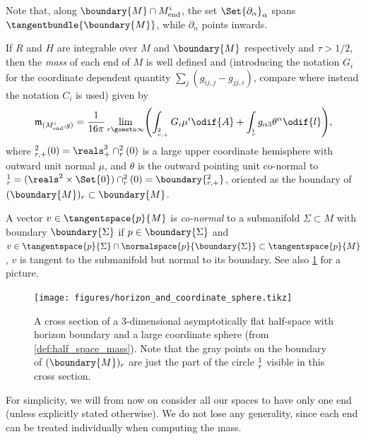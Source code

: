 \documentclass[titlepage,numbers=noenddot,oneside,%
cleardoublepage=empty,paper=a4,fontsize=11pt,%
english,%
]{scrartcl}
\let\sphere\relax
\newcommand{\sphere}{\mathbb{S}}
\newcommand{\Mend}{M_{\mathrm{end}}} %
\newcommand{\mass}[2]{\mathfrak{m}_{(#1,#2)}} %
\begin{document}
Note that, along \( \boundary{M}\cap \Mend^i \), the set \( \Set{\partial_\alpha}_\alpha \) spans \( \tangentbundle{\boundary{M}} \), while \( \partial_n \) points inwards.
\begin{definition}\label{def:half_space_mass}
    If \( R \) and \( H \) are integrable over \( M \) and \( \boundary{M} \) respectively and \( \tau>1/2 \), then the \emph{mass} of each end of \( M \) is well defined and (introducing the notation \( G_i \) for the coordinate dependent quantity \( \sum_j (g_{ij,j}-g_{jj,i}) \), compare \cite[Definition 1.1]{almarazPositiveMassTheorem2016} where instead the notation \( C_i \) is used) given by
    \begin{equation*}
        \mass{M_{\mathrm{end}}^i}{g}=\frac{1}{16\pi}\lim_{r \goesto \infty}\Biggl(\int_{\sphere_{r,+}^{2}}G_i\mu^i\odif{A}+\int_{\sphere_r^{1}}g_{\alpha 3}\theta^\alpha\odif{l}\Biggr),
    \end{equation*}
    where \( \sphere_{r,+}^{2}(0)=\reals^3_+\cap \sphere_r^2(0) \) is a large upper coordinate hemisphere with outward unit normal \( \mu \), and \( \theta \) is the outward pointing unit co-normal to \( \sphere_{r}^1=(\reals^2\times \Set{0})\cap \sphere_r^2(0)=\boundary{\sphere_{r,+}^2} \), oriented as the boundary of \( (\boundary{M})_r\subset \boundary{M} \).
\end{definition}
\begin{remark}\label{def:co-normal_vector}
    A vector \( v\in \tangentspace{p}{M} \) is \emph{co-normal} to a submanifold \( \Sigma\subset M \) with boundary \( \boundary{\Sigma} \) if \( p\in \boundary{\Sigma} \) and \( v\in \tangentspace{p}{\Sigma}\cap \normalspace{p}{\boundary{\Sigma}}\subset \tangentspace{p}{M} \), \ie \( v \) is tangent to the submanifold but normal to its boundary. See also \cref{fig:horizon_and_coordinate_sphere} for a picture.
\end{remark}
\begin{figure}
    \centering
    \texttt{[image: figures/horizon\_and\_coordinate\_sphere.tikz]}
    \caption{A cross section of a 3-dimensional asymptotically flat half-space with horizon boundary and a large coordinate sphere (from \cref{def:half_space_mass}). Note that the gray points on the boundary of \( (\boundary{M})_r \) are just the part of the circle \( \sphere^1_r \) visible in this cross section.}
    \label{fig:horizon_and_coordinate_sphere}
\end{figure}
\begin{remark}
    For simplicity, we will from now on consider all our spaces to have only one end (unless explicitly stated otherwise). We do not lose any generality, since each end can be treated individually when computing the mass.
\end{remark}
\end{document}
